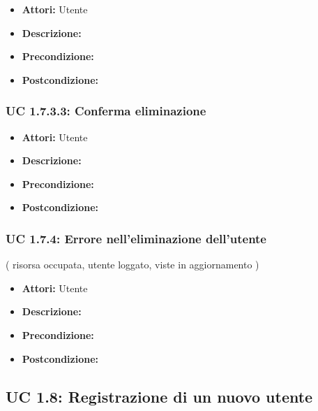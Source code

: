 \begin{itemize}
\item \textbf{Attori:} Utente
\item \textbf{Descrizione:} 
\item \textbf{Precondizione:} 
\item \textbf{Postcondizione:} 
\end{itemize}

\subsubsection{UC 1.7.3.3: Conferma eliminazione}

\begin{itemize}
\item \textbf{Attori:} Utente
\item \textbf{Descrizione:} 
\item \textbf{Precondizione:} 
\item \textbf{Postcondizione:} 
\end{itemize}

\subsubsection{UC 1.7.4: Errore nell’eliminazione dell'utente}
( risorsa occupata, utente loggato, viste in aggiornamento )

\begin{itemize}
\item \textbf{Attori:} Utente
\item \textbf{Descrizione:} 
\item \textbf{Precondizione:} 
\item \textbf{Postcondizione:} 
\end{itemize}

\subsection{UC 1.8: Registrazione di un nuovo utente}

